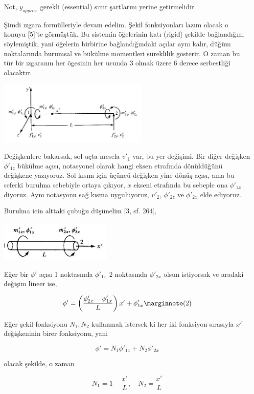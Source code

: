 \documentclass[12pt,fleqn]{article}\usepackage{../../common}
\begin{document}
Not, $y_{approx}$ gerekli (essential) sınır şartlarını yerine getirmelidir.

Şimdi ızgara formülleriyle devam edelim. Şekil fonksiyonları lazım olacak o
konuyu [5]'te görmüştük. Bu sistemin öğelerinin katı (rigid) şekilde
bağlandığını söylemiştik, yani öğelerin birbirine bağlandığındaki açılar aynı
kalır, düğüm noktalarında burumsal ve bükülme momentleri süreklilik gösterir. O
zaman bu tür bir ızgaranın her ögesinin her ucunda 3 olmak üzere 6 derece
serbestliği olacaktır.

\includegraphics[width=20em]{compscieng_bpp43fem_04.jpg}

Değişkenlere bakarsak, sol uçta mesela $v'_1$ var, bu yer değişimi.  Bir diğer
değişken $\phi'_{1z}$ bükülme açısı, notasyonel olarak hangi eksen etrafında
dönüldüğünü değişkene yazıyoruz. Sol kısım için üçüncü değişken yine dönüş
açısı, ama bu seferki burulma sebebiyle ortaya çıkıyor, $x$ ekseni etrafında bu
sebeple ona $\phi'_{1x}$ diyoruz. Aynı notasyonu sağ kısma uyguluyoruz, $v'_2$,
$\phi'_{2z}$ ve $\phi'_{2x}$ elde ediyoruz.

Burulma icin alttaki çubuğu düşünelim [3, sf. 264],

\includegraphics[width=15em]{compscieng_bpp43fem_02.jpg}

Eğer bir $\phi'$ açısı 1 noktasında $\phi'_{1x}$ 2 noktasında $\phi'_{2x}$
olsun istiyorsak ve aradaki değişim lineer ise,

$$
\phi' = \left( \frac{\phi'_{2x} - \phi'_{1x}}{L}  \right) x' + \phi'_{1x}
\mlabel{2}
$$

Eğer şekil fonksiyonu $N_1,N_2$ kullanmak istersek ki her iki fonksiyon
sırasıyla $x'$ değişkeninin birer fonksiyonu, yani

$$
\phi' = N_1 \phi'_{1x} + N_2 \phi'_{2x}
$$

olacak şekilde, o zaman

$$
N_1 = 1 - \frac{x'}{L}, \quad N_2 = \frac{x'}{L}
$$
\end{document}
